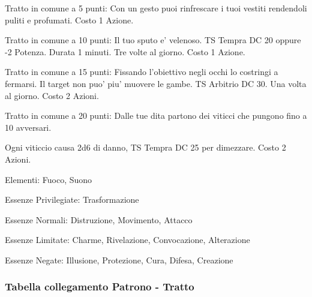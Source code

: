 \documentclass[a4paper,11pt,twoside,openany]{book}
\begin{document}
{		\bigskip
		
		Tratto in comune a 5 punti: Con un gesto puoi rinfrescare i tuoi vestiti rendendoli puliti e profumati. Costo 1 Azione.
		
		Tratto in comune a 10 punti: Il tuo sputo e' velenoso. TS Tempra DC 20 oppure -2 Potenza. Durata 1 minuti. Tre volte al giorno. Costo 1 Azione.
		
		Tratto in comune a 15 punti: Fissando l'obiettivo negli occhi lo costringi a fermarsi. Il target non puo' piu' muovere le gambe. TS Arbitrio DC 30. Una volta al giorno. Costo 2 Azioni.
		
		Tratto in comune a 20 punti: Dalle tue dita partono dei viticci che pungono fino a 10 avversari.
		
		Ogni viticcio causa 2d6 di danno, TS Tempra DC 25 per dimezzare. Costo 2 Azioni.
		
		\bigskip
		
		Elementi: Fuoco, Suono
		
		\bigskip
		
		Essenze Privilegiate: Trasformazione
		
		Essenze Normali: Distruzione, Movimento, Attacco
		
		Essenze Limitate: Charme, Rivelazione, Convocazione, Alterazione
		
		Essenze Negate: Illusione, Protezione, Cura, Difesa, Creazione
		
		\subsubsection{Tabella collegamento Patrono - Tratto}
		
}
\end{document}
